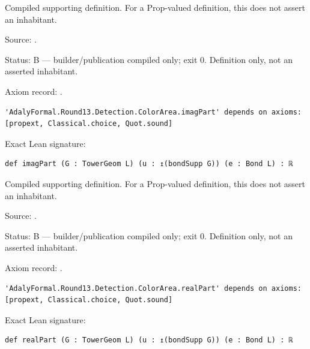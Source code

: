 \begin{definition}[bp-532]
\label{bp-532}
\uses{}
\leanok
Compiled supporting definition. For a Prop-valued definition, this does not assert an inhabitant.

\par Source: \texttt{}.
\par Status: B — builder/publication compiled only; exit 0. Definition only, not an asserted inhabitant.
\par Axiom record: \texttt{}.
\begin{verbatim}
'AdalyFormal.Round13.Detection.ColorArea.imagPart' depends on axioms: [propext, Classical.choice, Quot.sound]
\end{verbatim}
\par Exact Lean signature:
\begin{verbatim}
def imagPart (G : TowerGeom L) (u : ↥(bondSupp G)) (e : Bond L) : ℝ
\end{verbatim}
\end{definition}

\begin{definition}[bp-533]
\label{bp-533}
\uses{}
\leanok
Compiled supporting definition. For a Prop-valued definition, this does not assert an inhabitant.

\par Source: \texttt{}.
\par Status: B — builder/publication compiled only; exit 0. Definition only, not an asserted inhabitant.
\par Axiom record: \texttt{}.
\begin{verbatim}
'AdalyFormal.Round13.Detection.ColorArea.realPart' depends on axioms: [propext, Classical.choice, Quot.sound]
\end{verbatim}
\par Exact Lean signature:
\begin{verbatim}
def realPart (G : TowerGeom L) (u : ↥(bondSupp G)) (e : Bond L) : ℝ
\end{verbatim}
\end{definition}

